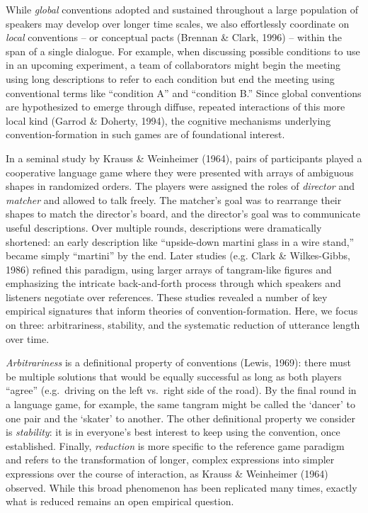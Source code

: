 \documentclass[alpha-refs]{wiley-article}
\begin{document}
While \emph{global} conventions adopted and sustained throughout a large
population of speakers may develop over longer time scales, we also
effortlessly coordinate on \emph{local} conventions -- or conceptual
pacts (Brennan \& Clark, 1996) -- within the span of a single dialogue.
For example, when discussing possible conditions to use in an upcoming
experiment, a team of collaborators might begin the meeting using long
descriptions to refer to each condition but end the meeting using
conventional terms like ``condition A'' and ``condition B.'' Since
global conventions are hypothesized to emerge through diffuse, repeated
interactions of this more local kind (Garrod \& Doherty, 1994), the
cognitive mechanisms underlying convention-formation in such games are
of foundational interest.

In a seminal study by Krauss \& Weinheimer (1964), pairs of participants
played a cooperative language game where they were presented with arrays
of ambiguous shapes in randomized orders. The players were assigned the
roles of \emph{director} and \emph{matcher} and allowed to talk freely.
The matcher's goal was to rearrange their shapes to match the director's
board, and the director's goal was to communicate useful descriptions.
Over multiple rounds, descriptions were dramatically shortened: an early
description like ``upside-down martini glass in a wire stand,'' became
simply ``martini'' by the end. Later studies (e.g. Clark \&
Wilkes-Gibbs, 1986) refined this paradigm, using larger arrays of
tangram-like figures and emphasizing the intricate back-and-forth
process through which speakers and listeners negotiate over references.
These studies revealed a number of key empirical signatures that inform
theories of convention-formation. Here, we focus on three:
arbitrariness, stability, and the systematic reduction of utterance
length over time.

\emph{Arbitrariness} is a definitional property of conventions (Lewis,
1969): there must be multiple solutions that would be equally successful
as long as both players ``agree'' (e.g.~driving on the left vs.~right
side of the road). By the final round in a language game, for example,
the same tangram might be called the `dancer' to one pair and the
`skater' to another. The other definitional property we consider is
\emph{stability}: it is in everyone's best interest to keep using the
convention, once established. Finally, \emph{reduction} is more specific
to the reference game paradigm and refers to the transformation of
longer, complex expressions into simpler expressions over the course of
interaction, as Krauss \& Weinheimer (1964) observed. While this broad
phenomenon has been replicated many times, exactly what is reduced
remains an open empirical question.
\end{document}
